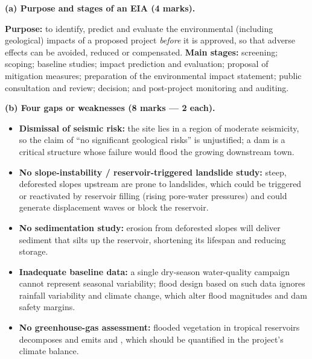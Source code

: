 \documentclass[11pt]{article}
\begin{document}
\begin{corrige}
\textbf{(a) Purpose and stages of an EIA (4 marks).}

\textbf{Purpose:} to identify, predict and evaluate the environmental (including geological) impacts of a proposed project \emph{before} it is approved, so that adverse effects can be avoided, reduced or compensated. \textbf{Main stages:} screening; scoping; baseline studies; impact prediction and evaluation; proposal of mitigation measures; preparation of the environmental impact statement; public consultation and review; decision; and post-project monitoring and auditing.

\textbf{(b) Four gaps or weaknesses (8 marks — 2 each).}
\begin{itemize}
\item \textbf{Dismissal of seismic risk:} the site lies in a region of moderate seismicity, so the claim of ``no significant geological risks'' is unjustified; a dam is a critical structure whose failure would flood the growing downstream town.
\item \textbf{No slope-instability / reservoir-triggered landslide study:} steep, deforested slopes upstream are prone to landslides, which could be triggered or reactivated by reservoir filling (rising pore-water pressures) and could generate displacement waves or block the reservoir.
\item \textbf{No sedimentation study:} erosion from deforested slopes will deliver sediment that silts up the reservoir, shortening its lifespan and reducing storage.
\item \textbf{Inadequate baseline data:} a single dry-season water-quality campaign cannot represent seasonal variability; flood design based on such data ignores rainfall variability and climate change, which alter flood magnitudes and dam safety margins.
\item \textbf{No greenhouse-gas assessment:} flooded vegetation in tropical reservoirs decomposes and emits  and , which should be quantified in the project's climate balance.
\end{itemize}


\end{corrige}
\end{document}
